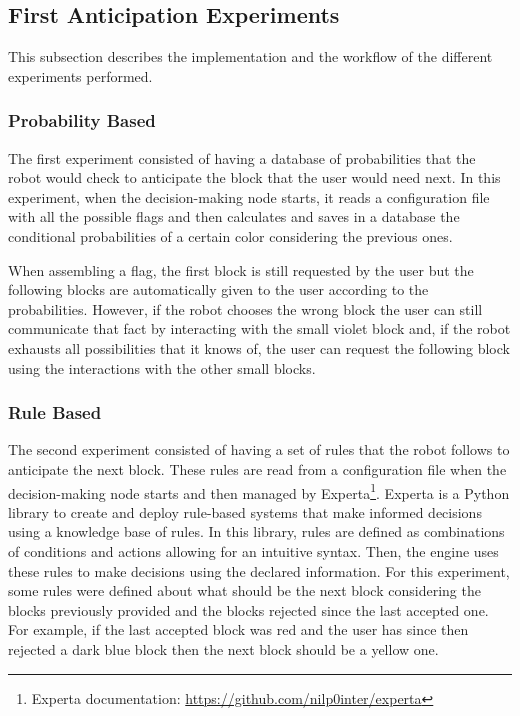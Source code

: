\subsection{First Anticipation Experiments}
\label{subsection:first_anticipation_experiments}

This subsection describes the implementation and the workflow of the different experiments performed.

\subsubsection{Probability Based}

The first experiment consisted of having a database of probabilities that the robot would check to anticipate the block that the user would need next. In this experiment, when the decision-making node starts, it reads a configuration file with all the possible flags and then calculates and saves in a database the conditional probabilities of a certain color considering the previous ones.

When assembling a flag, the first block is still requested by the user but the following blocks are automatically given to the user according to the probabilities. However, if the robot chooses the wrong block the user can still communicate that fact by interacting with the small violet block and, if the robot exhausts all possibilities that it knows of, the user can request the following block using the interactions with the other small blocks.

\subsubsection{Rule Based}

The second experiment consisted of having a set of rules that the robot follows to anticipate the next block. These rules are read from a configuration file when the decision-making node starts and then managed by Experta\footnote{Experta documentation: \url{https://github.com/nilp0inter/experta}}. Experta is a Python library to create and deploy rule-based systems that make informed decisions using a knowledge base of rules. In this library, rules are defined as combinations of conditions and actions allowing for an intuitive syntax. Then, the engine uses these rules to make decisions using the declared information. For this experiment, some rules were defined about what should be the next block considering the blocks previously provided and the blocks rejected since the last accepted one. For example, if the last accepted block was red and the user has since then rejected a dark blue block then the next block should be a yellow one.

